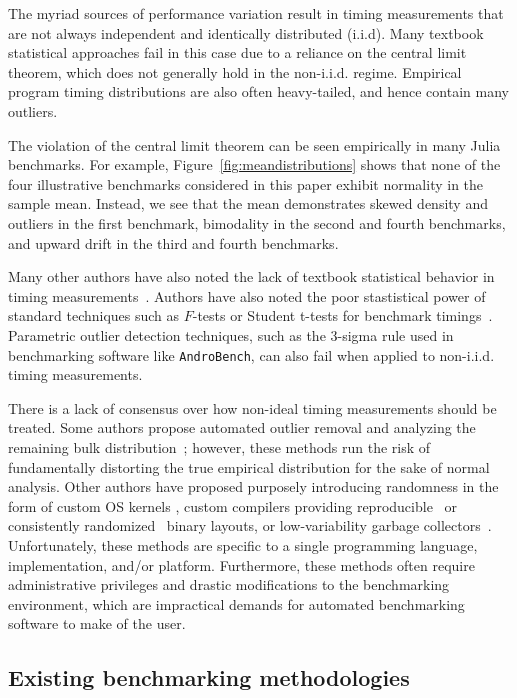 \documentclass[conference]{IEEEtran}
\begin{document}
The myriad sources of performance variation result in timing measurements that are not
always independent and identically distributed (i.i.d). Many textbook statistical approaches
fail in this case due to a reliance on the central limit theorem, which does not generally
hold in the non-i.i.d. regime. Empirical program timing distributions are also often
heavy-tailed, and hence contain many outliers.

The violation of the central limit theorem can be seen empirically in many Julia benchmarks.
For example, Figure~\ref{fig:meandistributions} shows that none of the four illustrative
benchmarks considered in this paper exhibit normality in the sample mean. Instead, we see
that the mean demonstrates skewed density and outliers in the first benchmark, bimodality in
the second and fourth benchmarks, and upward drift in the third and fourth benchmarks.

Many other authors have also noted the lack of textbook statistical behavior in timing
measurements~\cite{Gil2011,Chen2015,Rehn2015,Barrett2016}. Authors have also noted the poor
stastistical power of standard techniques such as $F$-tests or Student t-tests for benchmark
timings~\cite{Lilja2000,Mytkowicz2009,Kalibera2013,Chen2015,Barrett2016}. Parametric outlier
detection techniques, such as the 3-sigma rule used in benchmarking software like
\lstinline|AndroBench|\cite{Kim2012}, can also fail when applied to non-i.i.d. timing measurements.

There is a lack of consensus over how non-ideal timing measurements should be treated. Some
authors propose automated outlier removal and analyzing the remaining bulk
distribution~\cite{Kim2012}; however, these methods run the risk of fundamentally distorting
the true empirical distribution for the sake of normal analysis. Other authors have proposed
purposely introducing randomness in the form of custom OS kernels
\cite{Tessellation,Akkan2012}, custom compilers providing reproducible~\cite{Georges2008} or
consistently randomized~\cite{Curtsinger2013} binary layouts, or low-variability garbage
collectors~\cite{Huang2004}. Unfortunately, these methods are specific to a single
programming language, implementation, and/or platform. Furthermore, these methods often
require administrative privileges and drastic modifications to the benchmarking environment,
which are impractical demands for automated benchmarking software to make of the user.

\subsection{Existing benchmarking methodologies}
\label{sec:existingtools}
\end{document}
